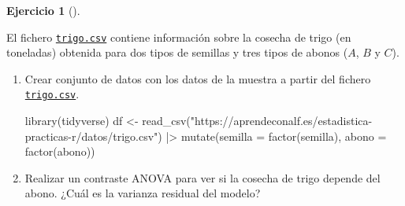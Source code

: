 \documentclass[
  a4paper,
]{scrreport}
\newenvironment{Shaded}{\begin{snugshade}}{\end{snugshade}}
\newcommand{\AttributeTok}[1]{\textcolor[rgb]{0.40,0.45,0.13}{#1}}
\newcommand{\FunctionTok}[1]{\textcolor[rgb]{0.28,0.35,0.67}{#1}}
\newcommand{\NormalTok}[1]{\textcolor[rgb]{0.00,0.23,0.31}{#1}}
\newcommand{\OtherTok}[1]{\textcolor[rgb]{0.00,0.23,0.31}{#1}}
\newcommand{\SpecialCharTok}[1]{\textcolor[rgb]{0.37,0.37,0.37}{#1}}
\newcommand{\StringTok}[1]{\textcolor[rgb]{0.13,0.47,0.30}{#1}}
\theoremstyle{definition}
\newtheorem{exercise}{Ejercicio}[chapter]
\theoremstyle{remark}
\begin{document}
\begin{exercise}[]\protect\hypertarget{exr-anova-dos-factores-trigo}{}\label{exr-anova-dos-factores-trigo}

El fichero
\href{https://aprendeconalf.es/estadistica-practicas-r/datos/trigo.csv}{\texttt{trigo.csv}}
contiene información sobre la cosecha de trigo (en toneladas) obtenida
para dos tipos de semillas y tres tipos de abonos (\(A\), \(B\) y
\(C\)).

\begin{enumerate}
\def\labelenumi{\alph{enumi}.}
\item
  Crear conjunto de datos con los datos de la muestra a partir del
  fichero
  \href{https://aprendeconalf.es/estadistica-practicas-r/datos/trigo.csv}{\texttt{trigo.csv}}.

  \begin{tcolorbox}[enhanced jigsaw, coltitle=black, left=2mm, colback=white, leftrule=.75mm, toptitle=1mm, breakable, bottomrule=.15mm, titlerule=0mm, bottomtitle=1mm, title=\textcolor{quarto-callout-tip-color}{\faLightbulb}\hspace{0.5em}{Solución}, arc=.35mm, toprule=.15mm, rightrule=.15mm, colframe=quarto-callout-tip-color-frame, opacityback=0, colbacktitle=quarto-callout-tip-color!10!white, opacitybacktitle=0.6]

\begin{Shaded}
\begin{Highlighting}[]
\FunctionTok{library}\NormalTok{(tidyverse)}
\NormalTok{df }\OtherTok{\textless{}{-}} \FunctionTok{read\_csv}\NormalTok{(}\StringTok{"https://aprendeconalf.es/estadistica{-}practicas{-}r/datos/trigo.csv"}\NormalTok{) }\SpecialCharTok{|\textgreater{}} 
    \FunctionTok{mutate}\NormalTok{(}\AttributeTok{semilla =} \FunctionTok{factor}\NormalTok{(semilla), }\AttributeTok{abono =} \FunctionTok{factor}\NormalTok{(abono))}
\end{Highlighting}
\end{Shaded}

  \end{tcolorbox}
\item
  Realizar un contraste ANOVA para ver si la cosecha de trigo depende
  del abono. ¿Cuál es la varianza residual del modelo?

  \begin{tcolorbox}[enhanced jigsaw, coltitle=black, left=2mm, colback=white, leftrule=.75mm, toptitle=1mm, breakable, bottomrule=.15mm, titlerule=0mm, bottomtitle=1mm, title=\textcolor{quarto-callout-tip-color}{\faLightbulb}\hspace{0.5em}{Solución}, arc=.35mm, toprule=.15mm, rightrule=.15mm, colframe=quarto-callout-tip-color-frame, opacityback=0, colbacktitle=quarto-callout-tip-color!10!white, opacitybacktitle=0.6]


\end{tcolorbox}
\end{enumerate}
\end{exercise}
\end{document}
